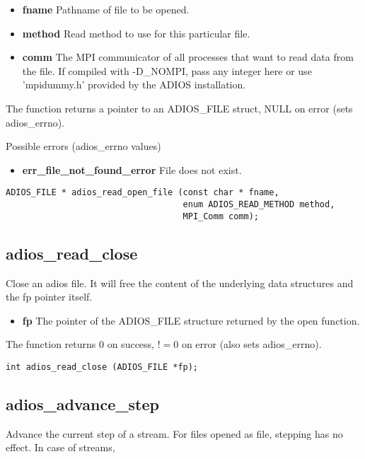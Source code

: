 \begin{itemize}
\item{\bf fname}    Pathname of file to be opened.
\item{\bf method}   Read method to use for this particular file.
\item{\bf comm}     The MPI communicator of all processes that want to read data from the file. If compiled with -D\_NOMPI, pass any integer here or use 'mpidummy.h' provided by the ADIOS installation. 
\end{itemize}

The function returns a pointer to an ADIOS\_FILE struct, NULL on error (sets adios\_errno). 

Possible errors (adios\_errno values)
\begin{itemize}
\item{\bf err\_file\_not\_found\_error}  File does not exist. 
\end{itemize}

\begin{lstlisting}[alsolanguage=C]
ADIOS_FILE * adios_read_open_file (const char * fname, 
                                   enum ADIOS_READ_METHOD method,
                                   MPI_Comm comm);
\end{lstlisting}

\subsection{adios\_read\_close}
Close an adios file. It will free the content of the underlying data structures and the fp pointer itself.

\begin{itemize}
\item{\bf fp}    The pointer of the ADIOS\_FILE structure returned by the open function.
\end{itemize}

The function returns 0 on success, $!=0$ on error (also sets adios\_errno).

\begin{lstlisting}[alsolanguage=C]
int adios_read_close (ADIOS_FILE *fp);

\end{lstlisting}

\subsection{adios\_advance\_step}
Advance the current step of a stream. For files opened as file, stepping has no effect.
In case of streams, 

